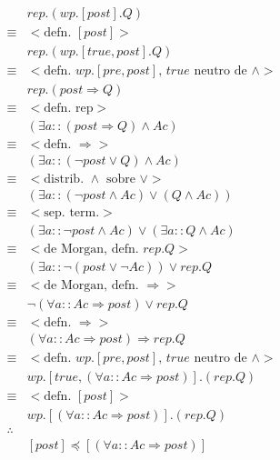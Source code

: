 \documentclass{article}
\begin{document}
\begin{align*}
 & rep.(wp.[post].Q) \\
 \equiv & <\text{defn. } [post]> \\
 & rep.(wp.[true,post].Q) \\
 \equiv & <\text{defn. } wp.[pre,post] \text{, } true \text{ neutro de } \wedge> \\
 & rep.(post \Rightarrow Q) \\
 \equiv & <\text{defn. rep}> \\
 & (\exists a :: (post \Rightarrow Q) \wedge Ac) \\
 \equiv & <\text{defn. } \Rightarrow> \\
 & (\exists a :: (\neg post \vee Q) \wedge Ac) \\
 \equiv & <\text{distrib. } \wedge \text{ sobre } \vee> \\
 & (\exists a :: (\neg post \wedge Ac) \vee (Q \wedge Ac)) \\
 \equiv & <\text{sep. term.}> \\
 & (\exists a :: \neg post \wedge Ac) \vee (\exists a :: Q \wedge Ac) \\
 \equiv & <\text{de Morgan, defn. } rep.Q> \\
 & (\exists a :: \neg (post \vee \neg Ac)) \vee rep.Q \\
 \equiv & <\text{de Morgan, defn. } \Rightarrow> \\
 & \neg (\forall a :: Ac \Rightarrow post) \vee rep.Q \\
 \equiv & <\text{defn. } \Rightarrow> \\
 & (\forall a :: Ac \Rightarrow post) \Rightarrow rep.Q \\
 \equiv & <\text{defn. } wp.[pre,post] \text{, } true \text{ neutro de } \wedge> \\
 & wp.[true,(\forall a :: Ac \Rightarrow post)].(rep.Q) \\
 \equiv & <\text{defn. } [post]> \\
 & wp.[(\forall a :: Ac \Rightarrow post)].(rep.Q) \\
 \therefore & \\
 & [post] \preccurlyeq [(\forall a :: Ac \Rightarrow post)]
\end{align*}
\end{document}
